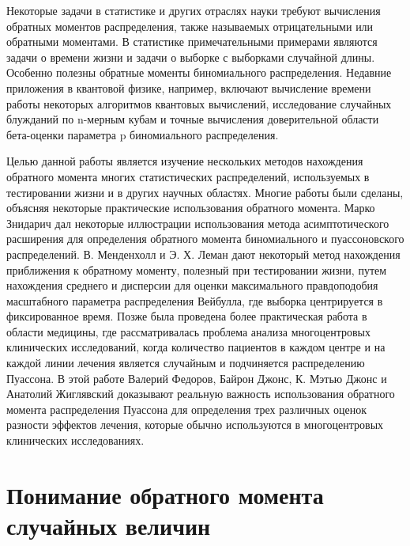 \documentclass[13pt]{article}
\begin{document}
Некоторые задачи в статистике и других отраслях науки требуют вычисления обратных моментов распределения, также называемых отрицательными или обратными моментами. В статистике примечательными примерами являются задачи о времени жизни и задачи о выборке с выборками случайной длины. Особенно полезны обратные моменты биномиального распределения. Недавние приложения в квантовой физике, например, включают вычисление времени работы некоторых алгоритмов квантовых вычислений, исследование случайных блужданий по n-мерным кубам и точные вычисления доверительной области бета-оценки параметра p биномиального распределения.\par
Целью данной работы является изучение нескольких методов нахождения обратного момента многих статистических распределений, используемых в тестировании жизни и в других научных областях. Многие работы были сделаны, объясняя некоторые практические использования обратного момента. Марко Знидарич дал некоторые иллюстрации использования метода асимптотического расширения для определения обратного момента биномиального и пуассоновского распределений. В. Менденхолл и Э. Х. Леман \cite{mendenhall1960approximation} дают некоторый метод нахождения приближения к обратному моменту, полезный при тестировании жизни, путем нахождения среднего и дисперсии для оценки максимального правдоподобия масштабного параметра распределения Вейбулла, где выборка центрируется в фиксированное время. Позже была проведена более практическая работа в области медицины, где рассматривалась проблема анализа многоцентровых клинических исследований, когда количество пациентов в каждом центре и на каждой линии лечения является случайным и подчиняется распределению Пуассона. В этой работе Валерий Федоров, Байрон Джонс, К. Мэтью Джонс и Анатолий Жиглявский \cite{fedorov2005multi} доказывают реальную важность использования обратного момента распределения Пуассона для определения трех различных оценок разности эффектов лечения, которые обычно используются в многоцентровых клинических исследованиях.


\section{Понимание обратного момента случайных величин}
\end{document}
